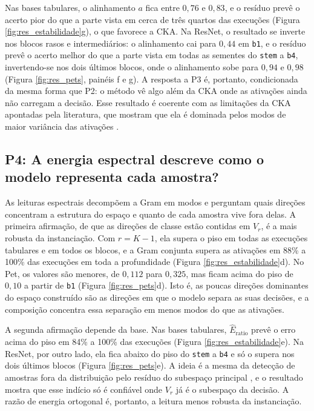 Nas bases tabulares, o alinhamento $a$ fica entre $0{,}76$ e $0{,}83$, e o resíduo prevê o acerto pior do que a parte vista em cerca de três quartos das execuções (Figura \ref{fig:res_estabilidade}g), o que favorece a CKA. Na ResNet, o resultado se inverte nos blocos rasos e intermediários: o alinhamento cai para $0{,}44$ em \texttt{b1}, e o resíduo prevê o acerto melhor do que a parte vista em todas as sementes do \texttt{stem} a \texttt{b4}, invertendo-se nos dois últimos blocos, onde o alinhamento sobe para $0{,}94$ e $0{,}98$ (Figura \ref{fig:res_pets}, painéis f e g). A resposta a P3 é, portanto, condicionada da mesma forma que P2: o método vê algo além da CKA onde as ativações ainda não carregam a decisão. Esse resultado é coerente com as limitações da CKA apontadas pela literatura, que mostram que ela é dominada pelos modos de maior variância das ativações \citep{Davari2023, Klabunde2025}.

\subsection{P4: A energia espectral descreve como o modelo representa cada amostra?}\label{subsec:res_espectro}

As leituras espectrais decompõem a Gram em modos e perguntam quais direções concentram a estrutura do espaço e quanto de cada amostra vive fora delas. A primeira afirmação, de que as direções de classe estão contidas em $V_r$, é a mais robusta da instanciação. Com $r = K-1$, ela supera o piso em todas as execuções tabulares e em todos os blocos, e a Gram conjunta supera as ativações em 88\% a 100\% das execuções em toda a profundidade (Figura \ref{fig:res_estabilidade}d). No Pet, os valores são menores, de $0{,}112$ para $0{,}325$, mas ficam acima do piso de $0{,}10$ a partir de \texttt{b1} (Figura \ref{fig:res_pets}d). Isto é, as poucas direções dominantes do espaço construído são as direções em que o modelo separa as suas decisões, e a composição concentra essa separação em menos modos do que as ativações.

A segunda afirmação depende da base. Nas bases tabulares, $\widehat{E}_{\mathrm{ratio}}$ prevê o erro acima do piso em 84\% a 100\% das execuções (Figura \ref{fig:res_estabilidade}e). Na ResNet, por outro lado, ela fica abaixo do piso do \texttt{stem} a \texttt{b4} e só o supera nos dois últimos blocos (Figura \ref{fig:res_pets}e). A ideia é a mesma da detecção de amostras fora da distribuição pelo resíduo do subespaço principal \citep{Wang2022ViM}, e o resultado mostra que esse indício só é confiável onde $V_r$ já é o subespaço da decisão. A razão de energia ortogonal é, portanto, a leitura menos robusta da instanciação.


